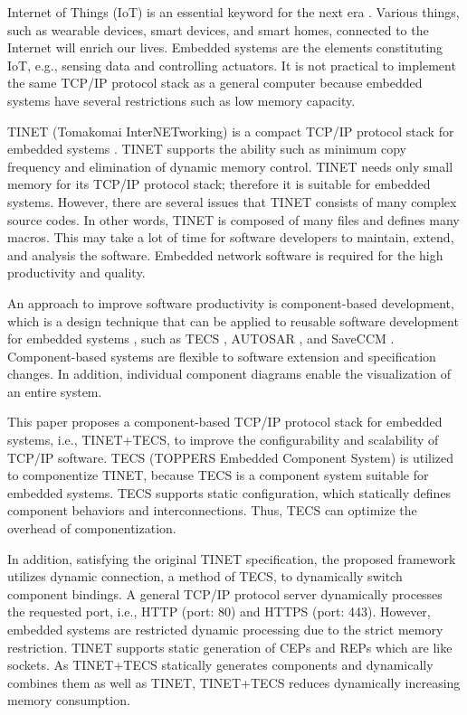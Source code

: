 \documentclass[conference]{IEEEtran/IEEEtran}
\begin{document}
Internet of Things (IoT) is an essential keyword for the next era \cite{par:IoTIndustries} \cite{par:IoTComputing}.
Various things, such as wearable devices, smart devices, and smart homes, connected to the Internet will enrich our lives.
Embedded systems are the elements constituting IoT, e.g., sensing data and controlling actuators.
It is not practical to implement the same TCP/IP protocol stack as a general computer because embedded systems have several restrictions such as low memory capacity.

TINET (Tomakomai InterNETworking) is a compact TCP/IP protocol stack for embedded systems \cite{url:TINET}.
TINET supports the ability such as minimum copy frequency and elimination of dynamic memory control.
TINET needs only small memory for its TCP/IP protocol stack; therefore it is suitable for embedded systems.
However, there are several issues that TINET consists of many complex source codes.
In other words, TINET is composed of many files and defines many macros.
This may take a lot of time for software developers to maintain, extend, and analysis the software.
Embedded network software is required for the high productivity and quality.

An approach to improve software productivity is component-based development, which is a design technique that can be applied to reusable software development for embedded systems \cite{par:Crnkovic}\cite{par:CBD}, such as TECS \cite{par:TECS} \cite{par:hr-tecs}, AUTOSAR \cite{url:AUTOSAR}, and SaveCCM \cite{par:SAVEapproach}.
Component-based systems are flexible to software extension and specification changes.
In addition, individual component diagrams enable the visualization of an entire system.

This paper proposes a component-based TCP/IP protocol stack for embedded systems, i.e., TINET+TECS, to improve the configurability and scalability of TCP/IP software.
TECS (TOPPERS Embedded Component System) \cite{par:TECS} \cite{par:hr-tecs} is utilized to componentize TINET, because TECS is a component system suitable for embedded systems.
TECS supports static configuration, which statically defines component behaviors and interconnections.
Thus, TECS can optimize the overhead of componentization.

In addition, satisfying the original TINET specification, the proposed framework utilizes dynamic connection, a method of TECS, to dynamically switch component bindings.
A general TCP/IP protocol server dynamically processes the requested port, i.e., HTTP (port: 80) and HTTPS (port: 443).
However, embedded systems are restricted dynamic processing due to the strict memory restriction.
TINET supports static generation of CEPs and REPs which are like sockets.
As TINET+TECS statically generates components and dynamically combines them as well as TINET, TINET+TECS reduces dynamically increasing memory consumption.
\end{document}
